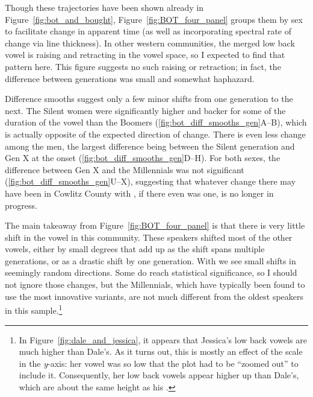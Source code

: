 Though these trajectories have been shown already in Figure~\ref{fig:bot_and_bought}, Figure~\ref{fig:BOT_four_panel} groups them by sex to facilitate change in apparent time (as well as incorporating spectral rate of change via line thickness). In other western communities, the merged low back vowel is raising and retracting in the vowel space, so I expected to find that pattern here. This figure suggests no such raising or retraction; in fact, the difference between generations was small and somewhat haphazard.

Difference smooths suggest only a few minor shifts from one generation to the next. The Silent women were significantly higher and backer for some of the duration of the vowel than the Boomers (\ref{fig:bot_diff_smooths_gen}A--B), which is actually opposite of the expected direction of change. There is even less change among the men, the largest difference being between the Silent generation and Gen X at the onset (\ref{fig:bot_diff_smooths_gen}D--H). For both sexes, the difference between Gen X and the Millennials was not significant (\ref{fig:bot_diff_smooths_gen}U--X), suggesting that whatever change there may have been in Cowlitz County with \lot, if there even was one, is no longer in progress.

The main takeaway from Figure~\ref{fig:BOT_four_panel} is that there is very little shift in the \lot vowel in this community. These speakers shifted most of the other vowels, either by small degrees that add up as the shift spans multiple generations, or as a drastic shift by one generation. With \lot we see small shifts in seemingly random directions. Some do reach statistical significance, so I should not ignore those changes, but the Millennials, which have typically been found to use the most innovative variants, are not much different from the oldest speakers in this sample.\footnote{In Figure~\ref{fig:dale_and_jessica}, it appears that Jessica's low back vowels are much higher than Dale's. As it turns out, this is mostly an effect of the scale in the \textit{y}-axis: her \bat vowel was so low that the plot had to be ``zoomed out'' to include it. Consequently, her low back vowels appear higher up than Dale's, which are about the same height as his \bat.}

